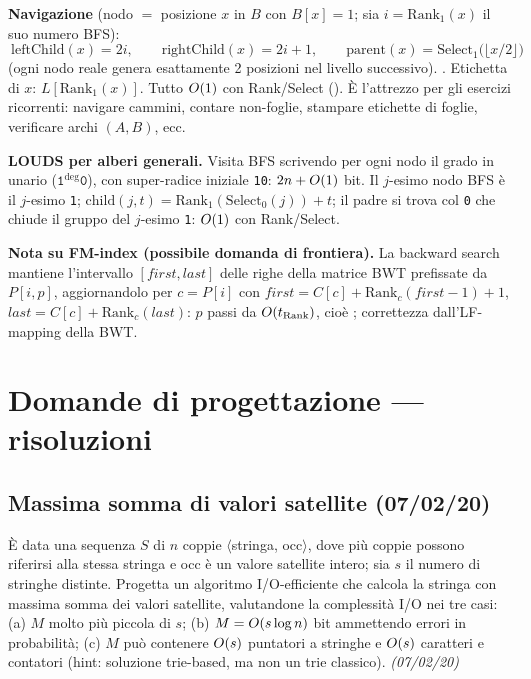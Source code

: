 \textbf{Navigazione} (nodo $=$ posizione $x$ in $B$ con $B[x]=1$; sia $i=\mathrm{Rank}_1(x)$ il
suo numero BFS):
\[
\boxed{\ \mathrm{leftChild}(x)=2i,\qquad
\mathrm{rightChild}(x)=2i+1,\qquad
\mathrm{parent}(x)=\mathrm{Select}_1\bigl(\lfloor x/2\rfloor\bigr)\ }
\]
(ogni nodo reale genera esattamente 2 posizioni nel livello successivo). . Etichetta di $x$: $L[\mathrm{Rank}_1(x)]$. Tutto $O\!\left(1\right)$ con
Rank/Select (). \`E l'attrezzo per gli esercizi ricorrenti: navigare cammini, contare
non-foglie, stampare etichette di foglie, verificare archi $(A,B)$, ecc.

\textbf{LOUDS per alberi generali.} Visita BFS scrivendo per ogni nodo il grado in unario
($\texttt{1}^{\deg}\texttt{0}$), con super-radice iniziale \texttt{10}: $2n+O\!\left(1\right)$ bit. Il
$j$-esimo nodo BFS \`e il $j$-esimo \texttt{1};
$\mathrm{child}(j,t)=\mathrm{Rank}_1(\mathrm{Select}_0(j))+t$; il padre si trova col \texttt{0}
che chiude il gruppo del $j$-esimo \texttt{1}: $O\!\left(1\right)$ con Rank/Select.

\textbf{Nota su FM-index (possibile domanda di frontiera).} La backward search mantiene
l'intervallo $[\mathit{first},\mathit{last}]$ delle righe della matrice BWT prefissate da
$P[i,p]$, aggiornandolo per $c=P[i]$ con
$\mathit{first}=C[c]+\mathrm{Rank}_c(\mathit{first}-1)+1$,
$\mathit{last}=C[c]+\mathrm{Rank}_c(\mathit{last})$: $p$ passi da $O\!\left(t_{\mathrm{Rank}}\right)$, cio\`e
; correttezza dall'LF-mapping della BWT.

\section{Domande di progettazione --- risoluzioni}

\subsection*{ Massima somma di valori satellite (07/02/20)}

\begin{domanda}
\`E data una sequenza $S$ di $n$ coppie $\langle$stringa, occ$\rangle$, dove pi\`u coppie possono
riferirsi alla stessa stringa e occ \`e un valore satellite intero; sia $s$ il numero di stringhe
distinte. Progetta un algoritmo I/O-efficiente che calcola la stringa con massima somma dei valori
satellite, valutandone la complessit\`a I/O nei tre casi: (a) $M$ molto pi\`u piccola di $s$;
(b) $M=O\!\left(s\log n\right)$ bit ammettendo errori in probabilit\`a; (c) $M$ pu\`o contenere $O\!\left(s\right)$
puntatori a stringhe e $O\!\left(s\right)$ caratteri e contatori (hint: soluzione trie-based, ma non un trie
classico). \emph{(07/02/20)}
\end{domanda}


